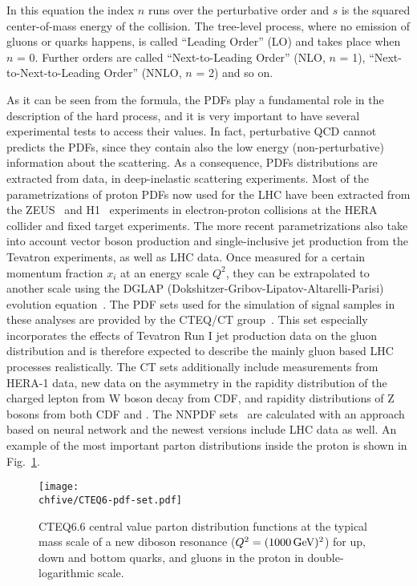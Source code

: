 In this equation the index $n$ runs over the perturbative order and $s$ is the squared center-of-mass energy of the collision.
The tree-level process, where no emission of gluons or quarks happens, is called ``Leading Order'' (LO) and takes place when $n$ = 0.
Further orders are called ``Next-to-Leading Order'' (NLO, $n$ = 1), ``Next-to-Next-to-Leading Order'' (NNLO, $n$ = 2) and so on.

As it can be seen from the formula, the PDFs play a fundamental role in the description of the hard process, and it is very important to have several experimental tests to access their values.
In fact, perturbative QCD cannot predicts the PDFs, since they contain also the low energy (non-perturbative) information about the scattering.
As a consequence, PDFs distributions are extracted from data, in deep-inelastic scattering experiments.
Most of the parametrizations of proton PDFs now used for the LHC have been extracted from the ZEUS~\cite{ZEUS:1993aa} and H1~\cite{ABT1997310} experiments in electron-proton collisions at the HERA collider and fixed target experiments.
The more recent parametrizations also take into account vector boson production and single-inclusive jet production from the Tevatron experiments, as well as LHC data.
Once measured for a certain momentum fraction $x_i$ at an energy scale $Q^2$, they can be extrapolated to another scale using the DGLAP (Dokshitzer-Gribov-Lipatov-Altarelli-Parisi) evolution equation~\cite{ALTARELLI1977298}.
The PDF sets used for the simulation of signal samples in these analyses are provided by the CTEQ/CT group~\cite{Pumplin:2002vw,Lai:2010vv}. This set especially incorporates the effects of Tevatron Run I jet production data on the gluon distribution and is therefore expected to describe the mainly gluon based LHC processes realistically. The CT sets additionally include measurements from HERA-1 data, new data on the asymmetry in the rapidity distribution of the charged lepton from W boson decay from CDF, and rapidity distributions of Z bosons from both CDF and \DZERO. The NNPDF sets~\cite{Ball:2011mu} are calculated with an approach based on neural network and the newest versions include LHC data as well.
An example of the most important parton distributions inside the proton is shown in Fig.~\ref{fig:pdfs}.\\

\begin{figure}[!htb]
\centering
\texttt{[image: \\chfive/CTEQ6-pdf-set.pdf]}
\caption{CTEQ6.6 central value parton distribution functions at the typical mass scale of a new diboson resonance ($Q^2 = (1000\,\text{Ge\hspace{-.08em}V})^2$) for up, down and bottom quarks, and gluons in the proton in double-logarithmic scale.}
\label{fig:pdfs}
\end{figure}

